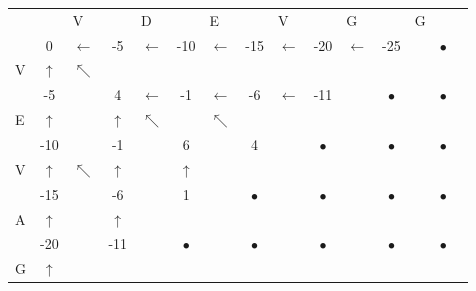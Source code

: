 \documentclass[landscape]{foils}
\begin{document}
\myNewSlide
{
\normalsize
\begin{center}
\begin{tabular}{lclclclclclclcl}
   &              & V             &  & D & & E & & V & & G & & G \\   
   & {\color{black} 0}      & {\color{green}$\leftarrow$}   & -5 &   {\color{green}$\leftarrow$} & -10 &   {\color{green}$\leftarrow$} & -15 &   {\color{green}$\leftarrow$} & -20& {\color{green}$\leftarrow$} & -25 &    & {\color{black}$\bullet$} \\
V  & {\color{green} $\uparrow$} & {\color{green}$\nwarrow$}    & {\color{black} $$ } &     & {\color{black} $$ } & {\color{black} $$} &     & {\color{black} $$ } &     & {\color{black} $$ } & {\color{black} $$} &     & {\color{black} $$ } &       \\
   & -5     &  & 4        &   {\color{green}$\leftarrow$} & -1 &   {\color{green} $\leftarrow$} & -6&  {\color{green}$\leftarrow$}  & -11&    & {\color{black}$\bullet$}&    & {\color{black}$\bullet$} \\
E  & {\color{green} $\uparrow$} &     & {\color{green} $\uparrow$ } & {\color{green}$\nwarrow$}    &  & {\color{green} $\nwarrow$ } &     & {\color{black} $$ } &     & {\color{black} $$ } & {\color{black} $$} &     & {\color{black} $$ } &       \\
   & -10 &    & -1        &    & 6 &    & 4&    & {\color{black}$\bullet$}&    & {\color{black}$\bullet$}&    & {\color{black}$\bullet$} \\
V  & {\color{green} $\uparrow$} & {\color{green} $\nwarrow$}    & {\color{green} $\uparrow$} &     & {\color{green} $\uparrow$ } & {\color{black} $$} &     & {\color{black} $$ } &     & {\color{black} $$ } & {\color{black} $$} &     & {\color{black} $$ } &       \\
   & -15      &    & -6        &    & 1 &    & {\color{black}$\bullet$}&    & {\color{black}$\bullet$}&    & {\color{black}$\bullet$}&    & {\color{black}$\bullet$} \\
A  & {\color{green} $\uparrow$} &     & {\color{green} $\uparrow$ } &     & {\color{black} $$ } & {\color{black} $$} &     & {\color{black} $$ } &     & {\color{black} $$ } & {\color{black} $$} &     & {\color{black} $$ } &       \\
   & -20      &    & -11        &    & {\color{black}$\bullet$} &    & {\color{black}$\bullet$}&    & {\color{black}$\bullet$}&    & {\color{black}$\bullet$}&    & {\color{black}$\bullet$} \\
G  & {\color{green} $\uparrow$} &     & {\color{black} $$ } &     & {\color{black} $$ } & {\color{black} $$} &     & {\color{black} $$ } &     & {\color{black} $$ } & {\color{black} $$} &     & {\color{black} $$ } &       \\

\end{tabular}
\end{center}}
\end{document}
